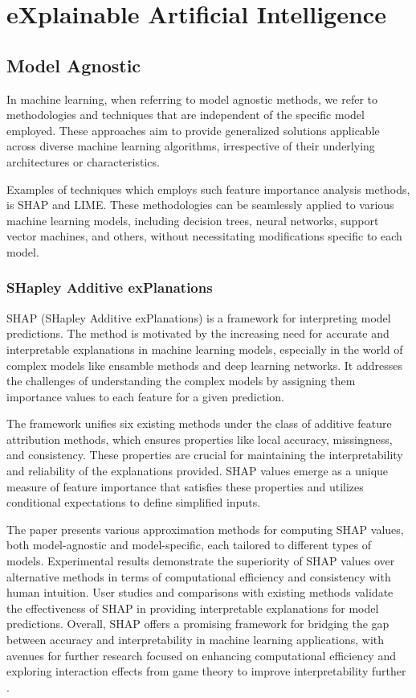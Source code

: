 \documentclass[UKenglish]{uiomasterthesis}
\begin{document}
\section{eXplainable Artificial Intelligence}

\subsection{Model Agnostic}
In machine learning, when referring to model agnostic methods, we refer to methodologies and techniques that are independent of the specific model employed. These approaches aim to provide generalized solutions applicable across diverse machine learning algorithms, irrespective of their underlying architectures or characteristics.

Examples of techniques which employs such feature importance analysis methods, is SHAP and LIME. These methodologies can be seamlessly applied to various machine learning models, including decision trees, neural networks, support vector machines, and others, without necessitating modifications specific to each model.

\subsubsection{SHapley Additive exPlanations}
SHAP (SHapley Additive exPlanations) is a framework for interpreting model predictions. \cite{lundberg_unified_2017} The method is motivated by the increasing need for accurate and interpretable explanations in machine learning models, especially in the world of complex models like ensamble methods and deep learning networks. It addresses the challenges of understanding the complex models by assigning them importance values to each feature for a given prediction. 

The framework unifies six existing methods under the class of additive feature attribution methods, which ensures properties like local accuracy, missingness, and consistency. These properties are crucial for maintaining the interpretability and reliability of the explanations provided. SHAP values emerge as a unique measure of feature importance that satisfies these properties and utilizes conditional expectations to define simplified inputs. 

The paper presents various approximation methods for computing SHAP values, both model-agnostic and model-specific, each tailored to different types of models. Experimental results demonstrate the superiority of SHAP values over alternative methods in terms of computational efficiency and consistency with human intuition. User studies and comparisons with existing methods validate the effectiveness of SHAP in providing interpretable explanations for model predictions. Overall, SHAP offers a promising framework for bridging the gap between accuracy and interpretability in machine learning applications, with avenues for further research focused on enhancing computational efficiency and exploring interaction effects from game theory to improve interpretability further \cite{lundberg_unified_2017}.
\end{document}
